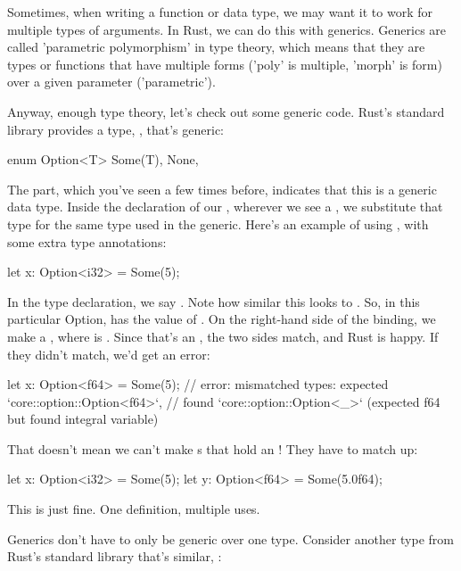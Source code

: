 Sometimes, when writing a function or data type, we may want it to work for multiple types of arguments. In Rust, we can do this with 
generics. Generics are called 'parametric polymorphism' in type theory, which means that they are types or functions that have multiple 
forms ('poly' is multiple, 'morph' is form) over a given parameter ('parametric').

\blank

Anyway, enough type theory, let's check out some generic code. Rust's standard library provides a type, , that's generic:

\begin{rustc}
enum Option<T> {
    Some(T),
    None,
}
\end{rustc}

The  part, which you've seen a few times before, indicates that this is a generic data type. Inside the declaration of our \enum, 
wherever we see a , we substitute that type for the same type used in the generic. Here's an example of using , with 
some extra type annotations:

\begin{rustc}
let x: Option<i32> = Some(5);
\end{rustc}

In the type declaration, we say . Note how similar this looks to . So, in this particular Option,  has 
the value of \itt. On the right-hand side of the binding, we make a , where  is . Since that's an \itt, the two 
sides match, and Rust is happy. If they didn't match, we'd get an error:

\begin{rustc}
let x: Option<f64> = Some(5);
// error: mismatched types: expected `core::option::Option<f64>`,
// found `core::option::Option<_>` (expected f64 but found integral variable)
\end{rustc}

That doesn't mean we can't make s that hold an ! They have to match up:

\begin{rustc}
let x: Option<i32> = Some(5);
let y: Option<f64> = Some(5.0f64);
\end{rustc}

This is just fine. One definition, multiple uses.

\blank

Generics don't have to only be generic over one type. Consider another type from Rust's standard library that's similar, :

